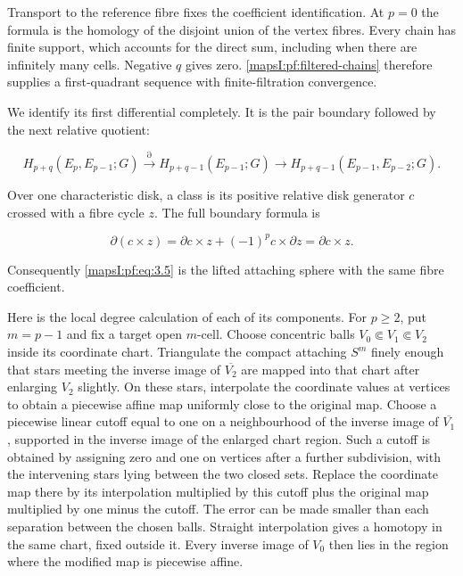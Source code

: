 \documentclass[11pt]{article}
\begin{document}
Transport to the reference fibre fixes the coefficient identification. At \(p=0\) the formula is the homology of the disjoint union of the vertex fibres. Every chain has finite support, which accounts for the direct sum, including when there are infinitely many cells. Negative \(q\) gives zero. \cref{mapsI:pf:filtered-chains} therefore supplies a first-quadrant sequence with finite-filtration convergence.

We identify its first differential completely. It is the pair boundary followed by the next relative quotient:

\begin{equation}
H_{p+q}(E_p,E_{p-1};G)\xrightarrow{\partial}
H_{p+q-1}(E_{p-1};G)\longrightarrow
H_{p+q-1}(E_{p-1},E_{p-2};G).
\label{mapsI:pf:eq:3.5}
\end{equation}

Over one characteristic disk, a class is its positive relative disk generator \(c\) crossed with a fibre cycle \(z\). The full boundary formula is

\begin{equation}
\partial(c\times z)=\partial c\times z+(-1)^p c\times\partial z
=\partial c\times z.
\label{mapsI:pf:eq:3.6}
\end{equation}

Consequently \eqref{mapsI:pf:eq:3.5} is the lifted attaching sphere with the same fibre coefficient.

Here is the local degree calculation of each of its components. For \(p\geq2\), put \(m=p-1\) and fix a target open \(m\)-cell. Choose concentric balls \(V_0\Subset V_1\Subset V_2\) inside its coordinate chart. Triangulate the compact attaching \(S^m\) finely enough that stars meeting the inverse image of \(\overline{V_2}\) are mapped into that chart after enlarging \(V_2\) slightly. On these stars, interpolate the coordinate values at vertices to obtain a piecewise affine map uniformly close to the original map. Choose a piecewise linear cutoff equal to one on a neighbourhood of the inverse image of \(\overline{V_1}\), supported in the inverse image of the enlarged chart region. Such a cutoff is obtained by assigning zero and one on vertices after a further subdivision, with the intervening stars lying between the two closed sets. Replace the coordinate map there by its interpolation multiplied by this cutoff plus the original map multiplied by one minus the cutoff. The error can be made smaller than each separation between the chosen balls. Straight interpolation gives a homotopy in the same chart, fixed outside it. Every inverse image of \(V_0\) then lies in the region where the modified map is piecewise affine.
\end{document}
